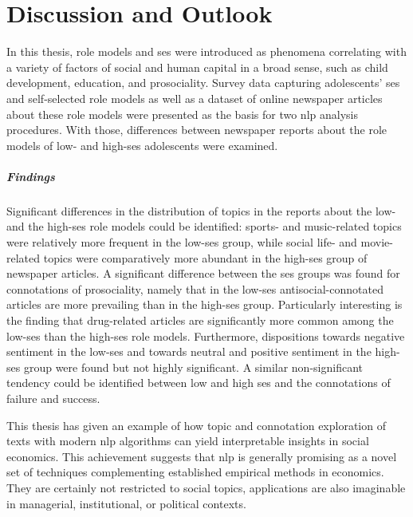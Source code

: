 \renewcommand{\imagepath}{../80-outro/img}

\chapter{Discussion and Outlook}
In this thesis, role models and \gls{ses} were introduced as phenomena correlating with a variety of factors of social and human capital in a broad sense, such as child development, education, and prosociality. Survey data capturing adolescents' \gls{ses} and self-selected role models as well as a dataset of online newspaper articles about these role models were presented as the basis for two \gls{nlp} analysis procedures. With those, differences between newspaper reports about the role models of low- and high-\gls{ses} adolescents were examined.

\paragraph{Findings}
Significant differences in the distribution of topics in the reports about the low- and the high-\gls{ses} role models could be identified: sports- and music-related topics were relatively more frequent in the low-\gls{ses} group, while social life- and movie-related topics were comparatively more abundant in the high-\gls{ses} group of newspaper articles. A significant difference between the \gls{ses} groups was found for connotations of prosociality, namely that in the low-\gls{ses} antisocial-connotated articles are more prevailing than in the high-\gls{ses} group. Particularly interesting is the finding that drug-related articles are significantly more common among the low-\gls{ses} than the high-\gls{ses} role models. Furthermore, dispositions towards negative sentiment in the low-\gls{ses} and towards neutral and positive sentiment in the high-\gls{ses} group were found but not highly significant. A similar non-significant tendency could be identified between low and high \gls{ses} and the connotations of failure and success.

This thesis has given an example of how topic and connotation exploration of texts with modern \gls{nlp} algorithms can yield interpretable insights in social economics. This achievement suggests that \gls{nlp} is generally promising as a novel set of techniques complementing established empirical methods in economics. They are certainly not restricted to social topics, applications are also imaginable in managerial, institutional, or political contexts.



